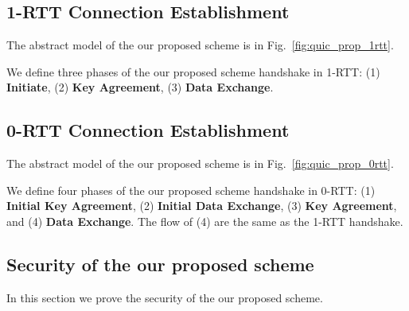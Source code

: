 \subsection{1-RTT Connection Establishment} \label{sec:quic_prop_1rtt}

The abstract model of the our proposed scheme is in
Fig.~\ref{fig:quic_prop_1rtt}.



We define three phases of the our proposed scheme handshake in 1-RTT:
(1) \textbf{Initiate},
(2) \textbf{Key Agreement},
(3) \textbf{Data Exchange}.





\subsection{0-RTT Connection Establishment} \label{sec:quic_prop_0rtt}

The abstract model of the our proposed scheme is in
Fig.~\ref{fig:quic_prop_0rtt}.



We define four phases of the our proposed scheme handshake in 0-RTT:
(1) \textbf{Initial Key Agreement},
(2) \textbf{Initial Data Exchange},
(3) \textbf{Key Agreement}, and
(4) \textbf{Data Exchange}.
The flow of (4) are the same as the 1-RTT
handshake.





\subsection{Security of the our proposed scheme} \label{sec:quic_proof}

In this section we prove the security of the our proposed scheme.

